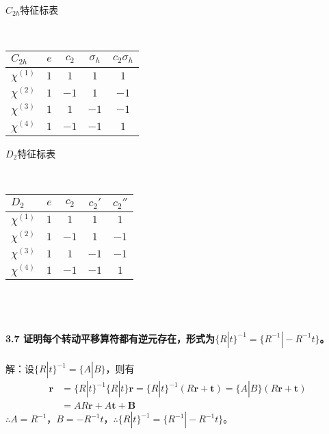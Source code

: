 \documentclass[12pt]{article}
\numberwithin{equation}{section}	 %
\begin{document}
\begin{spacing}{1.5}
\begin{minipage}{\textwidth} 	%
\begin{minipage}[t]{0.5\textwidth}
  \centering
	\makeatletter{}\makeatother\caption{$C_{2h}$特征标表}
	~\\
	\begin{tabular*}{5cm}{l|cccc}  %
		$C_{2h}$ & $e$ & $c_{2}$ & $\sigma_{h}$ & $c_{2}\sigma_{h}$\\  
		\hline  
		$\chi^{(1)}$ & $1$  & $1$ & $1$ & $1$\\  
		$\chi^{(2)}$ & $1$  & $-1$ & $1$ & $-1$\\ 
		$\chi^{(3)}$ & $1$ & $1$ & $-1$ & $-1$\\ 
		$\chi^{(4)}$ & $1$ & $-1$ & $-1$ & $1$\\ 
\end{tabular*}
\end{minipage}
\begin{minipage}[t]{0.5\textwidth}
   \centering
	\makeatletter{}\makeatother\caption{$D_{2}$特征标表}
	~\\
	\begin{tabular*}{5cm}{l|cccc}  %
	$D_{2}$ & $e$ & $c_{2}$ & $c_{2}'$ & $c_{2}''$\\  
	\hline  
	$\chi^{(1)}$ & $1$  & $1$ & $1$ & $1$\\  
	$\chi^{(2)}$ & $1$  & $-1$ & $1$ & $-1$\\ 
	$\chi^{(3)}$ & $1$ & $1$ & $-1$ & $-1$\\ 
	$\chi^{(4)}$ & $1$ & $-1$ & $-1$ & $1$\\ \end{tabular*}
\end{minipage}
\end{minipage}
~\\
~\\
~\\
\textbf{3.7 \quad 证明每个转动平移算符都有逆元存在，形式为$\{R|t\}^{-1}=\{R^{-1}|-R^{-1}t\}$。}\\
~\\
解：设$\{R|t\}^{-1}=\{A|B\}$，则有
\begin{align*}
\bm{r} &= \{R|t\}^{-1}\{R|t\}\bm{r} = \{R|t\}^{-1}(R\bm{r}+\bm{t}) = \{A|B\}(R\bm{r}+\bm{t}) \\
&= AR\bm{r}+A\bm{t}+\bm{B}
\end{align*}
$\therefore A=R^{-1}$，$B=-R^{-1}t$，$\therefore \{R|t\}^{-1}=\{R^{-1}|-R^{-1}t\}$。\\

\end{spacing}
\end{document}
